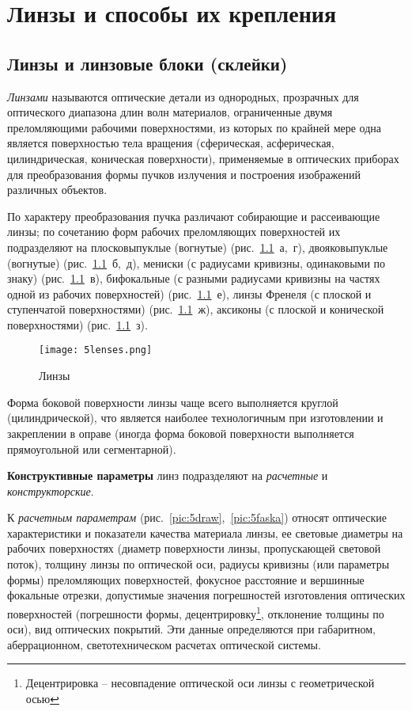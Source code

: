 \chapter{Линзы и способы их крепления}
\section{Линзы и линзовые блоки (склейки)}

\textit{Линзами} называются оптические детали из однородных, прозрачных для оптического диапазона длин волн материалов, ограниченные двумя преломляющими рабочими поверхностями, из которых по крайней мере одна является поверхностью тела вращения (сферическая, асферическая, цилиндрическая, коническая поверхности), применяемые в оптических приборах для преобразования формы пучков излучения и построения изображений различных объектов.

По характеру преобразования пучка различают собирающие и рассеивающие линзы; по сочетанию форм рабочих преломляющих поверхностей их подразделяют на плосковыпуклые (вогнутые) (рис.~\ref{pic:5lenses}~а,~г), двояковыпуклые (вогнутые) (рис.~\ref{pic:5lenses}~б,~д), мениски (с радиусами кривизны, одинаковыми по знаку) (рис.~\ref{pic:5lenses}~в), бифокальные (с разными радиусами кривизны на частях одной из рабочих поверхностей) (рис.~\ref{pic:5lenses}~е), линзы Френеля (с плоской и ступенчатой поверхностями) (рис.~\ref{pic:5lenses}~ж), аксиконы (с плоской и конической поверхностями) (рис.~\ref{pic:5lenses}~з).

\begin{figure}[h!]
	\caption{Линзы}
	\texttt{[image: 5lenses.png]}
	\label{pic:5lenses}
\end{figure}

Форма боковой поверхности линзы чаще всего выполняется круглой (цилиндрической), что является наиболее технологичным при изготовлении и закреплении в оправе (иногда форма боковой поверхности выполняется прямоугольной или сегментарной).

\textbf{Конструктивные параметры} линз подразделяют на \textit{расчетные} и \textit{конструкторские}.

К \textit{расчетным параметрам} (рис.~\ref{pic:5draw},~\ref{pic:5faska}) относят оптические характеристики и показатели качества материала линзы, ее световые диаметры на рабочих поверхностях (диаметр поверхности линзы, пропускающей световой поток), толщину линзы по оптической оси, радиусы кривизны (или параметры формы) преломляющих поверхностей, фокусное расстояние и вершинные фокальные отрезки, допустимые значения погрешностей изготовления оптических поверхностей (погрешности формы, децентрировку\footnote{Децентрировка -- несовпадение оптической оси линзы с геометрической осью}, отклонение толщины по оси), вид оптических покрытий. Эти данные определяются при габаритном, аберрационном, светотехническом расчетах оптической системы.

